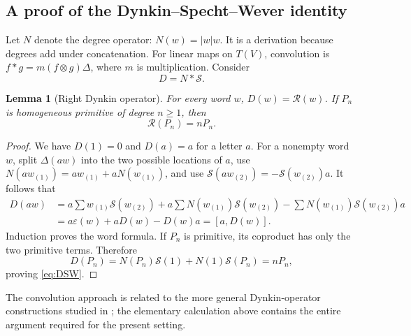 \documentclass[11pt]{article}
\newtheorem{lemma}[theorem]{Lemma}
\theoremstyle{definition}
\theoremstyle{remark}
\newcommand{\eps}{\varepsilon}
\newcommand{\Rbr}{\mathcal R}
\numberwithin{equation}{section}
\begin{document}
\subsection{A proof of the Dynkin--Specht--Wever identity}
Let $N$ denote the degree operator: $N(w)=|w|w$. It is a derivation because degrees add under concatenation. For linear maps on $T(V)$, convolution is $f*g=m(f\otimes g)\Delta$, where $m$ is multiplication. Consider
\[
 D=N*\mathcal S.
\]
\begin{lemma}[Right Dynkin operator]\label{lem:DSW}
For every word $w$, $D(w)=\Rbr(w)$. If $P_n$ is homogeneous primitive of degree $n\geq1$, then
\begin{equation}\label{eq:DSW}
 \Rbr(P_n)=nP_n.
\end{equation}
\end{lemma}
\begin{proof}
We have $D(1)=0$ and $D(a)=a$ for a letter $a$. For a nonempty word $w$, split $\Delta(aw)$ into the two possible locations of $a$, use $N(aw_{(1)})=aw_{(1)}+aN(w_{(1)})$, and use $\mathcal S(aw_{(2)})=-\mathcal S(w_{(2)})a$. It follows that
\begin{align*}
 D(aw)
 &=a\sum w_{(1)}\mathcal S(w_{(2)})
   +a\sum N(w_{(1)})\mathcal S(w_{(2)})
   -\sum N(w_{(1)})\mathcal S(w_{(2)})a\\
 &=a\eps(w)+aD(w)-D(w)a=[a,D(w)].
\end{align*}
Induction proves the word formula. If $P_n$ is primitive, its coproduct has only the two primitive terms. Therefore
\[
 D(P_n)=N(P_n)\mathcal S(1)+N(1)\mathcal S(P_n)=nP_n,
\]
proving \eqref{eq:DSW}.
\end{proof}
The convolution approach is related to the more general Dynkin-operator constructions studied in \cite{menouspatras}; the elementary calculation above contains the entire argument required for the present setting.
\end{document}
